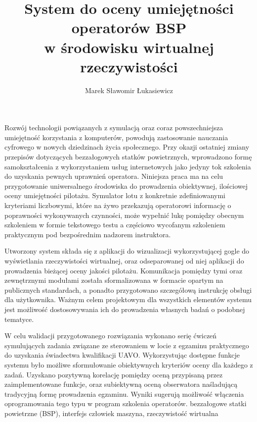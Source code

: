 \documentclass[
    a4paper,
    left=25mm,         %
    right=25mm,        %
    top=25mm,          %
    bottom=25mm,         %
    bindingoffset=5mm,  %
    nohyphenation=false %
]{src/wut-thesis}
\begin{document}
\MasterThesis %
{}
\title{
    System do oceny umiejętności operatorów BSP \\
    w środowisku wirtualnej rzeczywistości
}
\author{Marek Sławomir Łukasiewicz}
\date{\the\year}
\maketitle

\cleardoublepage %
\streszczenie Rozwój technologii powiązanych z symulacją oraz coraz powszechniejsza umiejętność korzystania z komputerów, powodują zastosowanie nauczania cyfrowego w nowych dziedzinach życia społecznego. Przy okazji ostatniej zmiany przepisów dotyczących bezzałogowych statków powietrznych, wprowadzono formę samokształcenia z wykorzystaniem usług internetowych jako jedyny tok szkolenia do uzyskania pewnych uprawnień operatora. Niniejsza praca ma na celu przygotowanie uniwersalnego środowiska do prowadzenia obiektywnej, ilościowej oceny umiejętności pilotażu. Symulator lotu z konkretnie zdefiniowanymi kryteriami liczbowymi, które na żywo przekazują operatorowi informację o poprawności wykonywanych czynności, może wypełnić lukę pomiędzy obecnym szkoleniem w formie tekstowego testu a częściowo wycofanym szkoleniem praktycznym pod bezpośrednim nadzorem instruktora.

Utworzony system składa się z aplikacji do wizualizacji wykorzystującej gogle do wyświetlania rzeczywistości wirtualnej, oraz odseparowanej od niej aplikacji do prowadzenia bieżącej oceny jakości pilotażu. Komunikacja pomiędzy tymi oraz zewnętrznymi modułami została sformalizowana w formacie opartym na publicznych standardach, a ponadto przygotowano szczegółową instrukcję obsługi dla użytkownika. Ważnym celem projektowym dla wszystkich elementów systemu jest możliwość dostosowywania ich do prowadzenia własnych badań o podobnej tematyce.

W celu walidacji przygotowanego rozwiązania wykonano serię ćwiczeń symulujących zadania związane ze sterowaniem w locie z egzaminu praktycznego do uzyskania świadectwa kwalifikacji UAVO. Wykorzystując dostępne funkcje systemu było możliwe sformułowanie obiektywnych kryteriów oceny dla każdego z zadań. Uzyskano pozytywną korelację pomiędzy oceną przypisaną przez zaimplementowane funkcje, oraz subiektywną oceną obserwatora naśladującą tradycyjną formę prowadzenia egzaminu. Wyniki sugerują możliwość włączenia oprogramowania tego typu w program szkolenia operatorów.
\slowakluczowe bezzałogowe statki powietrzne (BSP), interfejs człowiek maszyna, rzeczywistość wirtualna
\end{document}
